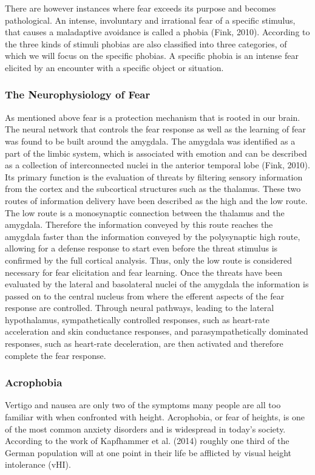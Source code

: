 There are however instances where fear exceeds its purpose and becomes pathological. An intense, involuntary and irrational fear of a specific stimulus, that causes a maladaptive avoidance is called a phobia (Fink, 2010). According to the three kinds of stimuli phobias are also classified into three categories, of which we will focus on the specific phobias. A specific phobia is an intense fear elicited by an encounter with a specific object or situation.

\subsubsection{The Neurophysiology of Fear} 
As mentioned above fear is a protection mechanism that is rooted in our brain. The neural network that controls the fear response as well as the learning of fear was found to be built around the amygdala. The amygdala was identified as a part of the limbic system, which is associated with emotion and can be described as a collection of interconnected nuclei in the anterior temporal lobe (Fink, 2010). Its primary function is the evaluation of threats by filtering sensory information from the cortex and the subcortical structures such as the thalamus. These two routes of information delivery have been described as the high and the low route. The low route is a monosynaptic connection between the thalamus and the amygdala. Therefore the information conveyed by this route reaches the amygdala faster than the information conveyed by the polysynaptic high route, allowing for a defense response to start even before the threat stimulus is confirmed by the full cortical analysis. Thus, only the low route is considered necessary for fear elicitation and fear learning. Once the threats have been evaluated by the lateral and basolateral nuclei of the amygdala the information is passed on to the central nucleus from where the efferent aspects of the fear response are controlled. Through neural pathways, leading to the lateral hypothalamus,  sympathetically controlled responses, such as heart-rate acceleration and skin conductance responses, and parasympathetically dominated responses, such as heart-rate deceleration, are then activated and therefore complete the fear response.

\subsubsection{Acrophobia}
Vertigo and nausea are only two of the symptoms many people are all too familiar with when confronted with height. Acrophobia, or fear of heights, is one of the most common anxiety disorders and is widespread in today's society. According to the work of Kapfhammer et al. (2014) roughly one third of the German population will at one point in their life be afflicted by visual height intolerance (vHI).
%



